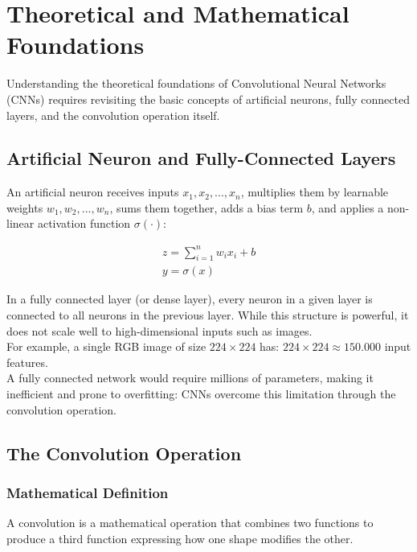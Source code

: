 \chapter{Theoretical and Mathematical Foundations}
\label{ch:th_math_foundations}%

Understanding the theoretical foundations of Convolutional Neural Networks (CNNs) requires revisiting the basic concepts of artificial neurons, fully connected layers, and the convolution operation itself.


\section{Artificial Neuron and Fully-Connected Layers}
\label{sec:an_fc_layers_recap}%

An artificial neuron receives inputs \(x_1, x_2,...,x_n\), multiplies them by learnable weights \(w_1, w_2,...,w_n\), sums them together, adds a bias term \(b\), and applies a non-linear activation function \(\sigma(\cdot)\):

\begin{align}
    z = \sum_{i=1}^{n} w_ix_i + b \label{eq:ann_1} \\
    y = \sigma(x) \label{eq:ann_2}
\end{align}

In a fully connected layer (or dense layer), every neuron in a given layer is connected to all neurons in the previous layer. While this structure is powerful, it does not scale well to high-dimensional inputs such as images.
\\
For example, a single RGB image of size \(224 \times 224\) has: \(224\times224\approx150.000\) input features.
\\
A fully connected network would require millions of parameters, making it inefficient and prone to overfitting: CNNs overcome this limitation through the convolution operation.

\section{The Convolution Operation}
\label{sec:convolution_op}%

\subsection{Mathematical Definition}
\label{subsec:math_definition}

A convolution is a mathematical operation that combines two functions to produce a third function expressing how one shape modifies the other.

